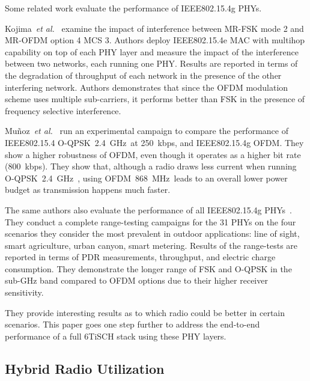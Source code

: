 \documentclass[sensors,article,submit,moreauthors,pdftex]{Definitions/mdpi}
\newcommand{\oqpsk}         {O-QPSK~2.4~GHz}
\newcommand{\ofdm}          {OFDM~868~MHz}
\newcommand{\etal}          {\textit{et al.}}
\begin{document}
Some related work evaluate the performance of IEEE802.15.4g PHYs.

Kojima~\etal~\cite{kojima15system} examine the impact of interference between MR-FSK mode 2 and MR-OFDM option 4 MCS 3. 
Authors deploy IEEE802.15.4e MAC with multihop capability on top of each PHY layer and measure the impact of the interference between two networks, each running one PHY.
Results are reported in terms of the degradation of throughput of each network in the presence of the other interfering network.
Authors demonstrates that since the OFDM modulation scheme uses multiple sub-carriers, it performs better than FSK in the presence of frequency selective interference. 

Mu\~noz~\etal~\cite{munoz18overview} run an experimental campaign to compare the performance of
    IEEE802.15.4 \oqpsk\ at 250~kbps, and
    IEEE802.15.4g OFDM.
They show a higher robustness of OFDM, even though it operates as a higher bit rate (800~kbps).
They show that, although a radio draws less current when running \oqpsk\ , using \ofdm\ leads to an overall lower power budget as transmission happens much faster.

The same authors also evaluate the performance of all IEEE802.15.4g PHYs~\cite{munoz18evaluation}.
They conduct a complete range-testing campaigns for the 31 PHYs on the four scenarios they consider the most prevalent in outdoor applications:
    line of sight,
    smart agriculture,
    urban canyon,
    smart metering. 
Results of the range-tests are reported in terms of PDR measurements, throughput, and electric charge consumption.
They demonstrate the longer range of FSK and O-QPSK in the sub-GHz band compared to OFDM options due to their higher receiver sensitivity.

They provide interesting results as to which radio could be better in certain scenarios.
This paper goes one step further to address the end-to-end performance of a full 6TiSCH stack using these PHY layers.

\subsection{Hybrid Radio Utilization}
\label{sec:related_hybrid}
\end{document}
